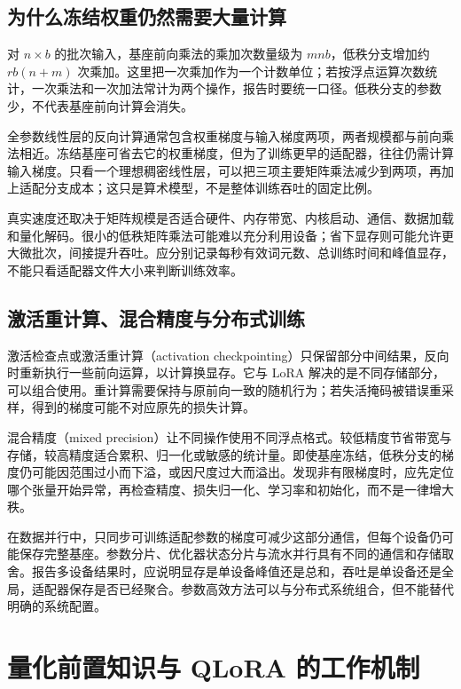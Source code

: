 \documentclass[UTF8,12pt,a4paper,fontset=fandol]{ctexart}
\begin{document}
\subsection{为什么冻结权重仍然需要大量计算}

对 $n\times b$ 的批次输入，基座前向乘法的乘加次数量级为 $mnb$，低秩分支增加约 $rb(n+m)$ 次乘加。这里把一次乘加作为一个计数单位；若按浮点运算次数统计，一次乘法和一次加法常计为两个操作，报告时要统一口径。低秩分支的参数少，不代表基座前向计算会消失。

全参数线性层的反向计算通常包含权重梯度与输入梯度两项，两者规模都与前向乘法相近。冻结基座可省去它的权重梯度，但为了训练更早的适配器，往往仍需计算输入梯度。只看一个理想稠密线性层，可以把三项主要矩阵乘法减少到两项，再加上适配分支成本；这只是算术模型，不是整体训练吞吐的固定比例。

真实速度还取决于矩阵规模是否适合硬件、内存带宽、内核启动、通信、数据加载和量化解码。很小的低秩矩阵乘法可能难以充分利用设备；省下显存则可能允许更大微批次，间接提升吞吐。应分别记录每秒有效词元数、总训练时间和峰值显存，不能只看适配器文件大小来判断训练效率。

\subsection{激活重计算、混合精度与分布式训练}

激活检查点或激活重计算（activation checkpointing）只保留部分中间结果，反向时重新执行一些前向运算，以计算换显存。它与 LoRA 解决的是不同存储部分，可以组合使用。重计算需要保持与原前向一致的随机行为；若失活掩码被错误重采样，得到的梯度可能不对应原先的损失计算。

混合精度（mixed precision）让不同操作使用不同浮点格式。较低精度节省带宽与存储，较高精度适合累积、归一化或敏感的统计量。即使基座冻结，低秩分支的梯度仍可能因范围过小而下溢，或因尺度过大而溢出。发现非有限梯度时，应先定位哪个张量开始异常，再检查精度、损失归一化、学习率和初始化，而不是一律增大秩。

在数据并行中，只同步可训练适配参数的梯度可减少这部分通信，但每个设备仍可能保存完整基座。参数分片、优化器状态分片与流水并行具有不同的通信和存储取舍。报告多设备结果时，应说明显存是单设备峰值还是总和，吞吐是单设备还是全局，适配器保存是否已经聚合。参数高效方法可以与分布式系统组合，但不能替代明确的系统配置。

\section{量化前置知识与 QLoRA 的工作机制}
\label{sec:quantization}
\end{document}
